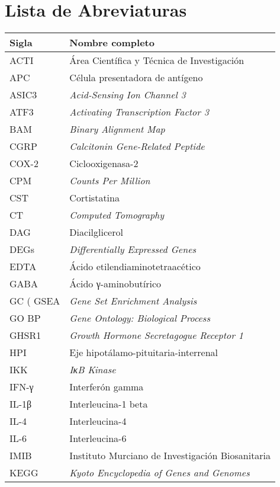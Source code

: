 \documentclass[10pt,a4paper]{article}
\begin{document}
\section*{Lista de Abreviaturas}
\setlength{\tabcolsep}{60pt}  %
\begin{tabular}{@{}ll@{}}
\textbf{Sigla} & \textbf{Nombre completo} \\ \midrule
ACTI & Área Científica y Técnica de Investigación \\
APC  & Célula presentadora de antígeno \\
ASIC3 & \textit{Acid-Sensing Ion Channel 3} \\
ATF3& \textit{Activating Transcription Factor 3} \\
BAM  & \textit{Binary Alignment Map} \\
CGRP & \textit{Calcitonin Gene-Related Peptide} \\
COX-2 & Ciclooxigenasa-2 \\
CPM  & \textit{Counts Per Million} \\
CST  & Cortistatina \\
CT & \textit{Computed Tomography} \\
DAG & Diacilglicerol \\
DEGs & \textit{Differentially Expressed Genes} \\
EDTA & Ácido etilendiaminotetraacético \\
GABA	 & Ácido γ-aminobutírico \\
GC (%
GSEA & \textit{Gene Set Enrichment Analysis} \\
GO BP	 & \textit{Gene Ontology: Biological Process} \\
GHSR1 & \textit{Growth Hormone Secretagogue Receptor 1} \\
HPI & Eje hipotálamo-pituitaria-interrenal \\
IKK & \textit{IκB Kinase} \\
IFN-γ & Interferón gamma \\
IL-1β & Interleucina-1 beta \\
IL-4	& Interleucina-4 \\
IL-6 & Interleucina-6 \\
IMIB & Instituto Murciano de Investigación Biosanitaria \\
KEGG & \textit{Kyoto Encyclopedia of Genes and Genomes} \\

\end{tabular}
\end{document}
